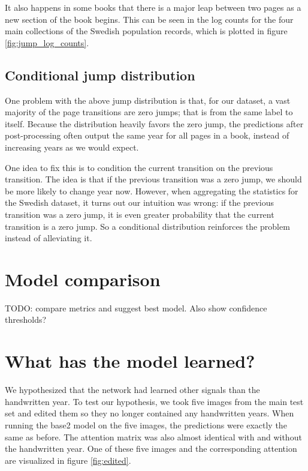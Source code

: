 It also happens in some books that there is a major leap between two pages as a new section of the book begins. This can be seen in the log counts for the four main collections of the Swedish population records, which is plotted in figure \ref{fig:jump_log_counts}.

\subsection{Conditional jump distribution}
One problem with the above jump distribution is that, for our dataset, a vast majority of the page transitions are zero jumps; that is from the same label to itself.
Because the distribution heavily favors the zero jump, the predictions after post-processing often output the same year for all pages in a book, instead of increasing years as we would expect.

One idea to fix this is to condition the current transition on the previous transition. The idea is that if the previous transition was a zero jump, we should be more likely to change year now. However, when aggregating the statistics for the Swedish dataset, it turns out our intuition was wrong: if the previous transition was a zero jump, it is even greater probability that the current transition is a zero jump. So a conditional distribution reinforces the problem instead of alleviating it.


\section{Model comparison}



TODO: compare metrics and suggest best model. Also show confidence thresholds?

\section{What has the model learned?}



We hypothesized that the network had learned other signals than the handwritten year. To test our hypothesis, we took five images from the main test set and edited them so they no longer contained any handwritten years. When running the base2 model on the five images, the predictions were exactly the same as before. The attention matrix was also almost identical with and without the handwritten year. One of these five images and the corresponding attention are visualized in figure \ref{fig:edited}.

